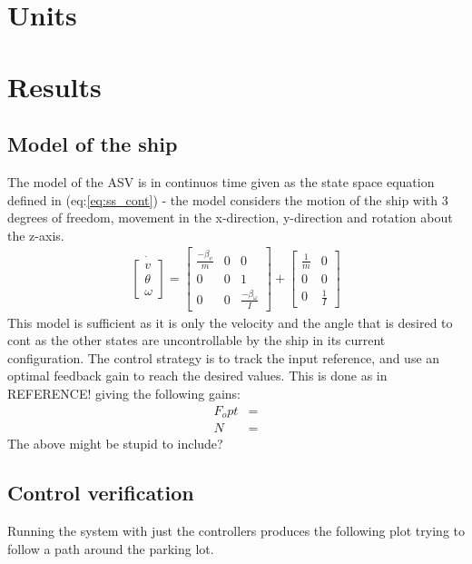 \documentclass{ifacconf}
\begin{document}
\section{Units}

\section{Results}

\subsection{Model of the ship}
The model of the ASV is in continuos time given as the state space equation defined in (eq:\ref{eq:ss_cont}) - the model considers the motion of the ship with 3 degrees of freedom, movement in the x-direction, y-direction and rotation about the z-axis. 
\begin{align}
\dot{\begin{bmatrix}
v\\
\theta\\
\omega
\end{bmatrix}} = \begin{bmatrix}
\frac{-\beta_v}{m} & 0 & 0\\
0 & 0 & 1\\
0 & 0 & \frac{-\beta_\omega}{I}
\end{bmatrix} + \begin{bmatrix}
\frac{1}{m} & 0\\
0 & 0\\
0 & \frac{1}{I}
\end{bmatrix}
\label{eq:ss_cont}
\end{align}
This model is sufficient as it is only the velocity and the angle that is desired to cont as the other states are uncontrollable by the ship in its current configuration. The control strategy is to track the input reference, and use an optimal feedback gain to reach the desired values. This is done as in REFERENCE! giving the following gains:
\begin{align}
F_opt &= \\
N &= 
\end{align}
The above might be stupid to include? 

\subsection{Control verification}
Running the system with just the controllers produces the following plot trying to follow a path around the parking lot. 
\end{document}
